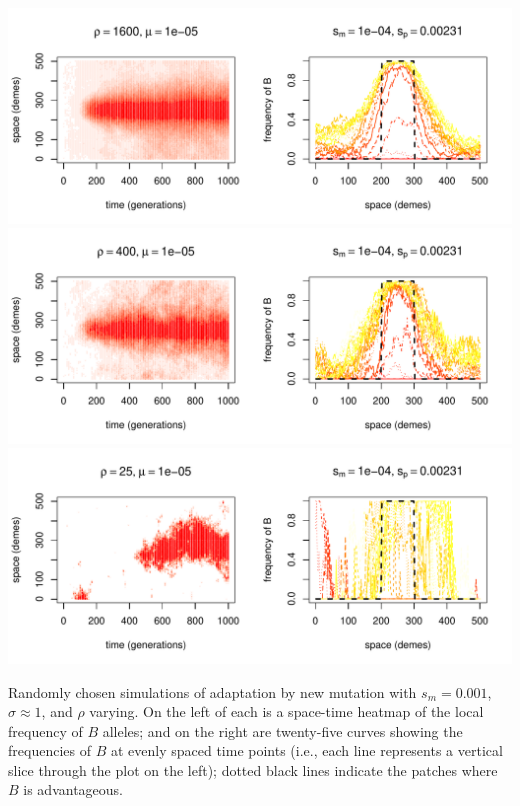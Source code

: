 \documentclass{article}
\begin{document}
\begin{sfigure}
  \begin{center}
    \includegraphics{example-mutation-sims/15449-r1-501-sb0_01-sm-1e-04-N1600-pophistory-run}
    \includegraphics{example-mutation-sims/5582-r1-501-sb0_01-sm-1e-04-N400-pophistory-run}
    \includegraphics{example-mutation-sims/24639-r1-501-sb0_01-sm-1e-04-N25-pophistory-run}
  \end{center}
  \caption{
    Randomly chosen simulations of adaptation by new mutation
    with $s_m=0.001$, $\sigma\approx 1$, and $\rho$ varying.
    On the left of each is a space-time heatmap of the local frequency of $B$ alleles;
    and on the right are twenty-five curves showing the frequencies of $B$ at evenly spaced time points
    (i.e., each line represents a vertical slice through the plot on the left);
    dotted black lines indicate the patches where $B$ is advantageous.
  } \label{sfig:sims_4}
\end{sfigure}
\end{document}
